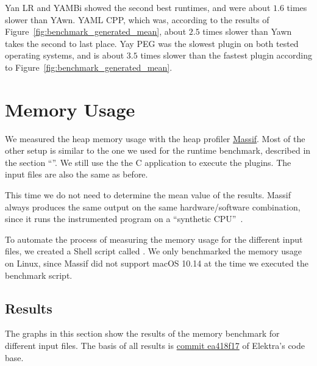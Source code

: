 Yan LR and YAMBi showed the second best runtimes, and were about $1.6$ times slower than YAwn. YAML CPP, which was, according to the results of Figure~\ref{fig:benchmark_generated_mean}, about $2.5$ times slower than Yawn takes the second to last place. Yay PEG was the slowest plugin on both tested operating systems, and is about $3.5$ times slower than the fastest plugin according to Figure~\ref{fig:benchmark_generated_mean}.

\section{Memory Usage}
\label{sec:memory_usage}

\newcommand{\FileBenchmarkMemory}{{%
\href{http://rawdata.libelektra.org/tree/master/YAML/Scripts/benchmark-memory}%
{\sh{benchmark-memory}}%
}}

We measured the heap memory usage with the heap profiler \href{http://valgrind.org/docs/manual/ms-manual.html}{Massif}. Most of the other setup is similar to the one we used for the runtime benchmark, described in the section “”. We still use the the C application \FilePluginGetSet{} to execute the plugins. The input files are also the same as before.

This time we do not need to determine the mean value of the results. Massif always produces the same output on the same hardware/software combination, since it runs the instrumented program \FilePluginGetSet{} on a “synthetic CPU”~\cite{valgrind2019core}.

To automate the process of measuring the memory usage for the different input files, we created a Shell script called \FileBenchmarkMemory{}. We only benchmarked the memory usage on Linux, since Massif did not support macOS 10.14 at the time we executed the benchmark script.

\subsection{Results}

The graphs in this section show the results of the memory benchmark for different input files. The basis of all results is \href{https://github.com/ElektraInitiative/libelektra/commit/ea418f177a5e2707f59f61b5e130a596abdd1c56}{commit ea418f17} of Elektra’s code base.

